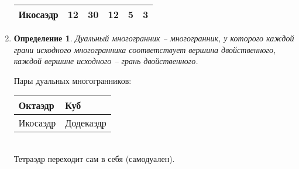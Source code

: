 \documentclass[12pt]{article}
\newtheorem{definition}{Определение}
\begin{document}
\begin{enumerate}
\begin{table}[h!]
\begin{tabular}{|l|l|l|l|l|l|}
Икосаэдр     & 12 & 30 & 12 & 5 & 3 \\ \hline
\end{tabular}
\end{table}
\item
\begin{definition}
Дуальный многогранник -- многогранник, у которого каждой грани исходного многогранника соответствует вершина двойственного, каждой вершине исходного -- грань двойственного. 
\end{definition}
Пары дуальных многогранников:
\begin{table}[h!]
\centering
\begin{tabular}{|l|l|}
\hline
Октаэдр  & Куб       \\ \hline
Икосаэдр & Додекаэдр \\ \hline
\end{tabular}
\end{table}\\
Тетраэдр переходит сам в себя (самодуален).
\end{enumerate}
\end{document}
